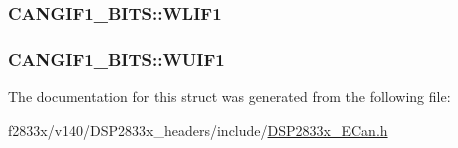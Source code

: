 \subsubsection[{W\+L\+I\+F1}]{ C\+A\+N\+G\+I\+F1\+\_\+\+B\+I\+T\+S\+::\+W\+L\+I\+F1}\label{struct_c_a_n_g_i_f1___b_i_t_s_ac5d05096e150eed5550e96710bfc833f}
\hypertarget{struct_c_a_n_g_i_f1___b_i_t_s_ad6b44edb5114dd5b608621b6a02eadd0}{}
\subsubsection[{W\+U\+I\+F1}]{ C\+A\+N\+G\+I\+F1\+\_\+\+B\+I\+T\+S\+::\+W\+U\+I\+F1}\label{struct_c_a_n_g_i_f1___b_i_t_s_ad6b44edb5114dd5b608621b6a02eadd0}


The documentation for this struct was generated from the following file\+:\begin{DoxyCompactItemize}
\item 
f2833x/v140/\+D\+S\+P2833x\+\_\+headers/include/\hyperlink{_d_s_p2833x___e_can_8h}{D\+S\+P2833x\+\_\+\+E\+Can.\+h}\end{DoxyCompactItemize}
